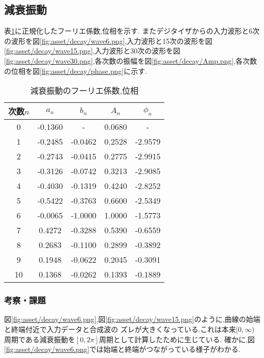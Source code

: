 \subsection{減衰振動}
表\ref{tab:decay_res}に正規化したフーリエ係数,位相を示す.
またデジタイザからの入力波形と6次の波形を図\ref{fig:asset/decay/wave6.png},入力波形と15次の波形を図\ref{fig:asset/decay/wave15.png},入力波形と30次の波形を図\ref{fig:asset/decay/wave30.png},各次数の振幅を図\ref{fig:asset/decay/Amp.png},各次数の位相を図\ref{fig:asset/decay/phase.png}に示す.
\begin{table}[h]
   \caption{減衰振動のフーリエ係数,位相}
   \label{tab:decay_res}
   \centering
   \begin{tabular}{ccccc}
     \hline
     次数$n$&$a_n$&$b_n$&$A_n$&$\phi_n$\\
     \hline \hline
     0 & -0.1360 & - & 0.0680 & - \\
1 & -0.2485 & -0.0462 & 0.2528 & -2.9579 \\
2 & -0.2743 & -0.0415 & 0.2775 & -2.9915 \\
3 & -0.3126 & -0.0742 & 0.3213 & -2.9085 \\
4 & -0.4030 & -0.1319 & 0.4240 & -2.8252 \\
5 & -0.5422 & -0.3763 & 0.6600 & -2.5349 \\
6 & -0.0065 & -1.0000 & 1.0000 & -1.5773 \\
7 & 0.4272 & -0.3288 & 0.5390 & -0.6559 \\
8 & 0.2683 & -0.1100 & 0.2899 & -0.3892 \\
9 & 0.1948 & -0.0622 & 0.2045 & -0.3091 \\
10 & 0.1368 & -0.0262 & 0.1393 & -0.1889 \\
     \hline
   \end{tabular}
\end{table}

\begin{figure}[htbp]
  \begin{minipage}{0.5\hsize}
  \end{minipage}
  \begin{minipage}{0.5\hsize}
  \end{minipage} 
\end{figure}

\begin{figure}[htbp]
  \begin{minipage}{0.5\hsize}
  \end{minipage}
  \begin{minipage}{0.5\hsize}
  \end{minipage} 
\end{figure}
\subsubsection{考察・課題}
図\ref{fig:asset/decay/wave6.png},図\ref{fig:asset/decay/wave15.png}のように,曲線の始端と終端付近で入力データと合成波の
ズレが大きくなっている.これは本来$[0,\infty)$周期である減衰振動を$[0,2\pi]$周期として計算したために生じている.
確かに,図\ref{fig:asset/decay/wave6.png}では始端と終端がつながっている様子がわかる.